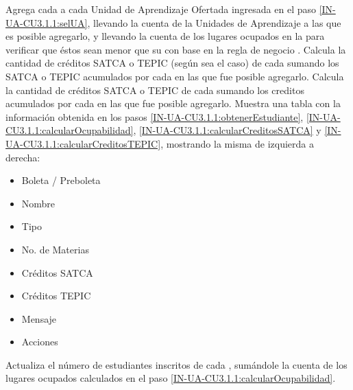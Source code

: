 \begin{UCtrayectoria}
    \UCpaso \label{IN-UA-CU3.1.1:calcularOcupabilidad}Agrega cada  a cada Unidad de Aprendizaje Ofertada ingresada en el paso \ref{IN-UA-CU3.1.1:selUA}, llevando la cuenta de la Unidades de Aprendizaje a las que es posible agregarlo, y llevando la cuenta de los lugares ocupados en la  para verificar que éstos sean menor que su  con base en la regla de negocio . 
    \UCpaso \label{IN-UA-CU3.1.1:calcularCreditosSATCA}Calcula la cantidad de créditos SATCA o TEPIC (según sea el caso) de cada  sumando los  SATCA o TEPIC acumulados por cada  en las que fue posible agregarlo.
    \UCpaso  \label{IN-UA-CU3.1.1:calcularCreditosTEPIC}Calcula la cantidad de créditos SATCA o TEPIC de cada  sumando los creditos acumulados por cada  en las que fue posible agregarlo.
    \UCpaso  \label{IN-UA-CU3.1.1:tabla}Muestra una tabla con la información obtenida en los pasos \ref{IN-UA-CU3.1.1:obtenerEstudiante}, \ref{IN-UA-CU3.1.1:calcularOcupabilidad}, \ref{IN-UA-CU3.1.1:calcularCreditosSATCA} y \ref{IN-UA-CU3.1.1:calcularCreditosTEPIC}, mostrando la misma de izquierda a derecha:
	    \begin{itemize}
	    	\item Boleta / Preboleta
	    	\item Nombre
	    	\item Tipo
	    	\item No. de Materias
	    	\item Créditos SATCA
	    	\item Créditos TEPIC
	    	\item Mensaje
	    	\item Acciones
	    \end{itemize}
    \UCpaso Actualiza el número de estudiantes inscritos de cada , sumándole la cuenta de los lugares ocupados calculados en el paso \ref{IN-UA-CU3.1.1:calcularOcupabilidad}.


\end{UCtrayectoria}
